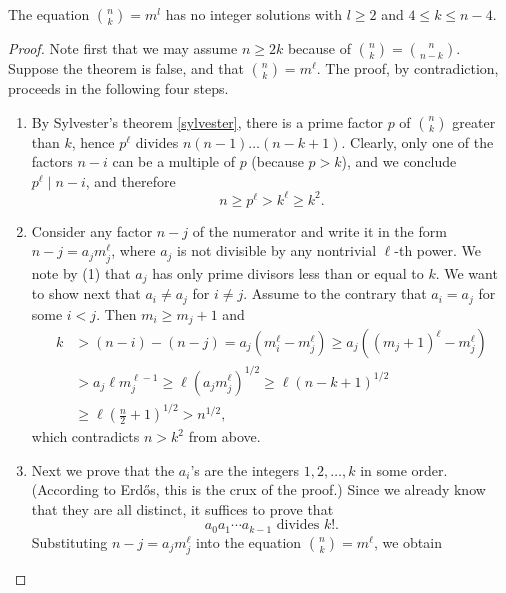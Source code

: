 \begin{theorem}
    \label{binomial_never_powers}
    \leanok
    The equation \(\binom n k = m ^ l\) has no integer solutions with
    \(l \ge 2\) and \(4 \le k \le n - 4\).
\end{theorem}
\begin{proof}
    Note first that we may assume \(n \ge 2k\) because of \(\binom{n}{k} = \binom{n}{n-k}\).
    Suppose the theorem is false, and that \(\binom{n}{k} = m^\ell\).
    The proof, by contradiction, proceeds in the following four steps.
    \begin{enumerate}
    \item By Sylvester's theorem \ref{sylvester}, there is a prime factor \(p\) of \(\binom{n}{k}\) greater than \(k\),
          hence \(p^\ell\) divides \(n(n - 1) \dots (n - k + 1)\). Clearly, only one of the factors \(n - i\)
          can be a multiple of \(p\) (because \(p > k\)), and we conclude \(p^\ell \mid n - i\), and therefore
          \[
          n \ge p^\ell > k^\ell \ge k^2.
          \]
    \item Consider any factor \(n - j\) of the numerator and write it in the form \(n - j = a_j m_j^\ell\),
          where \(a_j\) is not divisible by any nontrivial \(\ell\)-th power.
          We note by (1) that \(a_j\) has only prime divisors less than or equal to \(k\).
          We want to show next that \(a_i \ne a_j\) for \(i \ne j\).
          Assume to the contrary that \(a_i = a_j\) for some \(i < j\). Then \(m_i \ge m_j + 1\) and
        \begin{align*}
        k &> (n - i) - (n - j) = a_j(m_i^\ell - m_j^\ell) \ge a_j((m_j + 1)^\ell - m_j^\ell)\\
          &> a_j \ell m_j^{\ell-1} \ge \ell (a_j m_j^\ell)^{1/2} \ge \ell (n - k + 1)^{1/2}\\
          &\ge \ell \left(\frac{n}{2} + 1\right)^{1/2} > n^{1/2},
        \end{align*}
        which contradicts \(n > k^2\) from above.
    \item Next we prove that the \(a_i\)'s are the integers \(1, 2, \dots, k\) in some order.
    (According to Erdős, this is the crux of the proof.)
    Since we already know that they are all distinct, it suffices to prove that
   \[
   a_0 a_1 \cdots a_{k-1} \text{ divides } k!.
   \]
   Substituting \(n - j = a_j m_j^\ell\) into the equation \(\binom{n}{k} = m^\ell\), we obtain

\end{enumerate}
\end{proof}
